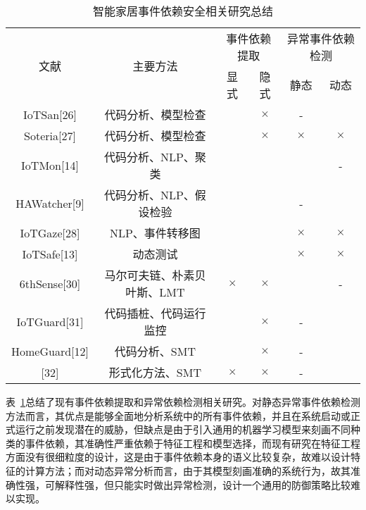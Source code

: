\begin{table}[h]
	\caption{智能家居事件依赖安全相关研究总结}
	\label{tab:event_dep_refs}
	\centering
	\begin{tabular}{cccccc}
		\toprule
		\multirow{2}{*}{文献} & \multirow{2}{*}{主要方法} & \multicolumn{2}{c}{事件依赖提取} & \multicolumn{2}{c}{异常事件依赖检测} \\
		\cline{3-6}
		&                       & 显式           & 隐式          & 静态            & 动态           \\
		\midrule
		IoTSan{[}26{]}      & 代码分析、模型检查             & \checkmark            & $\times$           & -             & \checkmark            \\
		Soteria{[}27{]}     & 代码分析、模型检查             & \checkmark            & $\times$           & $\times$             & $\times$            \\
		IoTMon{[}14{]}      & 代码分析、NLP、聚类           & \checkmark            & \checkmark           & \checkmark             & -            \\
		HAWatcher{[}9{]}    & 代码分析、NLP、假设检验         & \checkmark            & \checkmark           & -             & \checkmark            \\
		IoTGaze{[}28{]}     & NLP、事件转移图             & \checkmark            & \checkmark           & $\times$             & $\times$            \\
		IoTSafe{[}13{]}     & 动态测试                  & \checkmark            & \checkmark           & $\times$             & $\times$            \\
		6thSense{[}30{]}    & 马尔可夫链、朴素贝叶斯、LMT       & $\times$            & $\times$           & \checkmark             & -            \\
		IoTGuard{[}31{]}    & 代码插桩、代码运行监控           & \checkmark            & $\times$           & -             & \checkmark            \\
		HomeGuard{[}12{]}   & 代码分析、SMT              & \checkmark            & $\times$           & -             & \checkmark            \\
		{[}32{]}            & 形式化方法、SMT             & $\times$            & $\times$           & -             & \checkmark        \\
		\bottomrule    
	\end{tabular}
\end{table}

表~\ref{tab:event_dep_refs}总结了现有事件依赖提取和异常依赖检测相关研究。对静态异常事件依赖检测方法而言，其优点是能够全面地分析系统中的所有事件依赖，并且在系统启动或正式运行之前发现潜在的威胁，但缺点是由于引入通用的机器学习模型来刻画不同种类的事件依赖，其准确性严重依赖于特征工程和模型选择，而现有研究在特征工程方面没有很细粒度的设计，这是由于事件依赖本身的语义比较复杂，故难以设计特征的计算方法；而对动态异常分析而言，由于其模型刻画准确的系统行为，故其准确性强，可解释性强，但只能实时做出异常检测，设计一个通用的防御策略比较难以实现。

